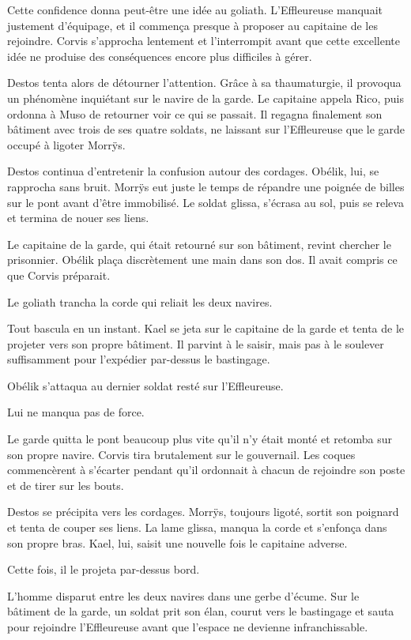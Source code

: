 Cette confidence donna peut-être une idée au goliath. L’Effleureuse manquait justement d’équipage, et il commença presque à proposer au capitaine de les rejoindre. Corvis s’approcha lentement et l’interrompit avant que cette excellente idée ne produise des conséquences encore plus difficiles à gérer.

Destos tenta alors de détourner l'attention. Grâce à sa thaumaturgie, il provoqua un phénomène inquiétant sur le navire de la garde. Le capitaine appela Rico, puis ordonna à Muso de retourner voir ce qui se passait. Il regagna finalement son bâtiment avec trois de ses quatre soldats, ne laissant sur l'Effleureuse que le garde occupé à ligoter Morrÿs.

Destos continua d'entretenir la confusion autour des cordages. Obélik, lui, se rapprocha sans bruit. Morrÿs eut juste le temps de répandre une poignée de billes sur le pont avant d'être immobilisé. Le soldat glissa, s'écrasa au sol, puis se releva et termina de nouer ses liens.

Le capitaine de la garde, qui était retourné sur son bâtiment, revint chercher le prisonnier. Obélik plaça discrètement une main dans son dos. Il avait compris ce que Corvis préparait.

Le goliath trancha la corde qui reliait les deux navires.

\scenebreak

Tout bascula en un instant. Kael se jeta sur le capitaine de la garde et tenta de le projeter vers son propre bâtiment. Il parvint à le saisir, mais pas à le soulever suffisamment pour l'expédier par-dessus le bastingage.

Obélik s'attaqua au dernier soldat resté sur l'Effleureuse.

Lui ne manqua pas de force.

Le garde quitta le pont beaucoup plus vite qu'il n'y était monté et retomba sur son propre navire. Corvis tira brutalement sur le gouvernail. Les coques commencèrent à s'écarter pendant qu'il ordonnait à chacun de rejoindre son poste et de tirer sur les bouts.

Destos se précipita vers les cordages. Morrÿs, toujours ligoté, sortit son poignard et tenta de couper ses liens. La lame glissa, manqua la corde et s'enfonça dans son propre bras. Kael, lui, saisit une nouvelle fois le capitaine adverse.

Cette fois, il le projeta par-dessus bord.

L'homme disparut entre les deux navires dans une gerbe d'écume. Sur le bâtiment de la garde, un soldat prit son élan, courut vers le bastingage et sauta pour rejoindre l'Effleureuse avant que l'espace ne devienne infranchissable.

